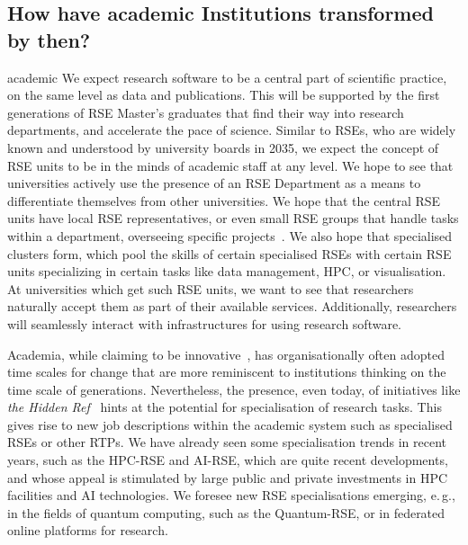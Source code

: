 \documentclass{eceasst}
\newcommand{\eg}{e.\,g.}
\begin{document}
\subsection{How have academic Institutions transformed by then?}
\begin{whatis}{}{academic}
We expect research software to be a central part of scientific practice, on the same level as data and publications.
This will be supported by the first generations of RSE Master's graduates that find their way into research departments, and accelerate the pace of science.
Similar to RSEs, who are widely known and understood by university boards in 2035, we expect the concept of RSE units to be in the minds
of academic staff at any level.
We hope to see that universities actively use the presence of an RSE Department as a means to differentiate themselves from other universities.
We hope that the central RSE units have local RSE representatives, or even small RSE groups that handle tasks within a department, overseeing specific projects~\cite{Kempf2025-draft}.
We also hope that specialised clusters form, which pool the skills of certain specialised RSEs with certain RSE units specializing in certain tasks like data management, HPC, or visualisation.
At universities which get such RSE units, we want to see that researchers naturally accept them as part of their available services.
Additionally, researchers will seamlessly interact with infrastructures for using research software.
\end{whatis}
Academia, while claiming to be innovative~\cite{wzvgbayern},
has organisationally often adopted time scales for change that are more reminiscent
to institutions thinking on the time scale of generations.
Nevertheless, the presence, even today, of initiatives like \emph{the Hidden Ref}~\cite{hiddenref}
hints at the potential for specialisation of research tasks.
This gives rise to new job descriptions within the academic system such as specialised RSEs or other RTPs.
We have already seen some specialisation trends in recent years,
such as the HPC-RSE and AI-RSE, which are quite recent developments,
and whose appeal is stimulated by large public and private investments in HPC facilities and AI technologies.
We foresee new RSE specialisations emerging, \eg, in the fields of quantum computing,
such as the Quantum-RSE, or in federated online platforms for research.
\end{document}
